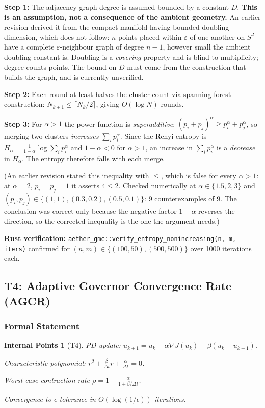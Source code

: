 \documentclass[11pt, a4paper]{article}
\theoremstyle{proofform}
\newtheorem{innerpoints}{Internal Points}
\numberwithin{innerpoints}{subsection}
\numberwithin{disproof}{subsection}
\theoremstyle{mathproof}
\begin{document}
\begin{Proof}
\textbf{Step 1:} The adjacency graph degree is assumed bounded by a constant
$D$. \textbf{This is an assumption, not a consequence of the ambient
geometry.} An earlier revision derived it from the compact manifold having
bounded doubling dimension, which does not follow: $n$ points placed within
$\varepsilon$ of one another on $S^2$ have a complete $\varepsilon$-neighbour
graph of degree $n-1$, however small the ambient doubling constant is.
Doubling is a \emph{covering} property and is blind to multiplicity; degree
counts points. The bound on $D$ must come from the construction that builds
the graph, and is currently unverified.

\textbf{Step 2:} Each round at least halves the cluster count via spanning forest construction: $N_{k+1} \leq \lceil N_k/2 \rceil$, giving $O(\log N)$ rounds.

\textbf{Step 3:} For $\alpha > 1$ the power function is \emph{superadditive}:
$(p_i + p_j)^\alpha \geq p_i^\alpha + p_j^\alpha$, so merging two clusters
\emph{increases} $\sum_i p_i^\alpha$. Since the Renyi entropy is
$H_\alpha = \frac{1}{1-\alpha}\log \sum_i p_i^\alpha$ and $1 - \alpha < 0$ for
$\alpha > 1$, an increase in $\sum_i p_i^\alpha$ is a \emph{decrease} in
$H_\alpha$. The entropy therefore falls with each merge.

(An earlier revision stated this inequality with $\leq$, which is false for
every $\alpha > 1$: at $\alpha = 2$, $p_i = p_j = 1$ it asserts $4 \leq 2$.
Checked numerically at $\alpha \in \{1.5, 2, 3\}$ and
$(p_i,p_j) \in \{(1,1),(0.3,0.2),(0.5,0.1)\}$: 9 counterexamples of 9. The
conclusion was correct only because the negative factor $1-\alpha$ reverses
the direction, so the corrected inequality is the one the argument needs.)

\textbf{Rust verification:} \texttt{aether\_gmc::verify\_entropy\_nonincreasing(n, m, iters)} confirmed for $(n, m) \in \{(100, 50), (500, 500)\}$ over 1000 iterations each.
\end{Proof}

\subsection{T4: Adaptive Governor Convergence Rate (AGCR)}
\label{sec:agcr}

\subsubsection*{Formal Statement}
\begin{innerpoints}[T4]
\item PD update: $u_{k+1} = u_k - \alpha\nabla J(u_k) - \beta(u_k - u_{k-1})$.
\item Characteristic polynomial: $r^2 + \frac{\beta}{\Delta t}r + \frac{\alpha}{\Delta t} = 0$.
\item Worst-case contraction rate $\rho = 1 - \frac{\alpha}{1 + \beta/\Delta t}$.
\item Convergence to $\epsilon$-tolerance in $O(\log(1/\epsilon))$ iterations.
\end{innerpoints}
\end{document}
